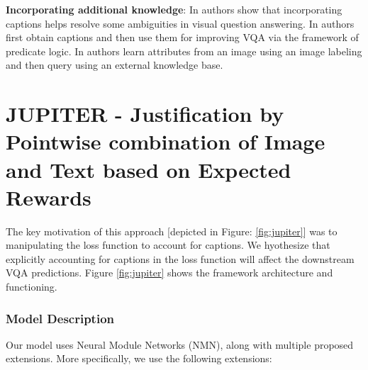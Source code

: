 \noindent\textbf{Incorporating additional knowledge}: In \cite{chandu2018textually} authors show that incorporating captions helps resolve some ambiguities in visual question answering. In \cite{aditya2018explicit} authors first obtain captions and then use them for improving VQA via the framework of predicate logic. In \cite{wu2016ask} authors learn attributes from an image using an image labeling and then query using an external knowledge base. 


\section{JUPITER - Justification by Pointwise combination of Image and Text based on Expected Rewards}
 The key motivation of this approach [depicted in Figure: \ref{fig:jupiter}] was to manipulating the loss function to account for captions. We hyothesize that explicitly accounting for captions in the loss function will affect the downstream VQA predictions. Figure \ref{fig:jupiter} shows the framework architecture and functioning.

\subsubsection{Model Description}
Our model uses Neural Module Networks (NMN), along with multiple proposed extensions. More specifically, we use the following extensions:

